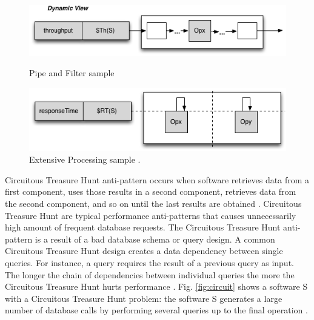 \documentclass[espaco=umemeio,chapter=TITLE,twoside,openright]{abnt}
\begin{document}
\begin{figure}[h]
\begin{minipage}{.5\textwidth}
\centering
\includegraphics[width=1\textwidth]{./images/pipe2.png}
\caption{Pipe and Filter sample \cite{Vetoio2011}}
\label{fig:pipefilter}
\end{minipage}
\begin{minipage}{.5\textwidth}
\centering
\includegraphics[width=1\textwidth]{./images/extpro.png}
\caption{Extensive Processing sample \cite{Vetoio2011}.}
\label{fig:extpro}
\end{minipage}
\end{figure}


Circuitous Treasure Hunt anti-pattern occurs when software retrieves data from a first component, uses those results in a second component, retrieves data from the second component, and so on until the last results are obtained \cite{Smith2002} \cite{Smith2003}. Circuitous Treasure Hunt
are typical performance anti-patterns that causes  unnecessarily high amount of frequent database requests. The Circuitous Treasure Hunt anti-pattern is a result of a bad database schema or query design. A common Circuitous Treasure Hunt design creates a data dependency between single queries. For instance, a query requires the
result of a previous query as input. The longer the chain of
dependencies between individual queries the more the Circuitous
Treasure Hunt hurts performance \cite{Wert2014}. Fig. \ref{fig:circuit}  shows a software S with a Circuitous Treasure Hunt problem: the software  S generates a large number of database calls by performing several queries up to the final operation \cite{Vetoio2011}.
\end{document}
